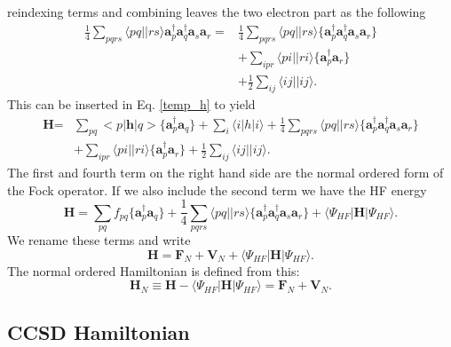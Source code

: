 \documentclass[a4paper,norsk,11pt,twoside]{report}
\begin{document}
reindexing terms and combining leaves the two electron part as the
following
\begin{align}
\frac{1}{4} \sum_{pqrs} \langle pq||rs \rangle \textbf{a}^{\dag}_p \textbf{a}^{\dag}_q \textbf{a}_s \textbf{a}_r = & \frac{1}{4}
\sum_{pqrs} \langle pq||rs \rangle \{\textbf{a}^{\dag}_p \textbf{a}^{\dag}_q \textbf{a}_s \textbf{a}_r\}
 \\ &
+ \sum_{ipr} \langle pi||ri \rangle \{\textbf{a}^{\dag}_p \textbf{a}_r \} \nonumber \\ &
+ \frac{1}{2} \sum_{ij} \langle ij||ij \rangle . \nonumber
\end{align}
This can be inserted in Eq. \eqref{temp_h} to yield
\begin{align}
\textbf{H} = & \sum_{pq} <p|\textbf{h}|q> 
\{\textbf{a}^{\dag}_p \textbf{a}_q \}
+ \sum_i \langle i|h|i \rangle
 + \frac{1}{4}
\sum_{pqrs} \langle pq||rs \rangle \{\textbf{a}^{\dag}_p \textbf{a}^{\dag}_q \textbf{a}_s \textbf{a}_r\}
 \\ &
+ \sum_{ipr} \langle pi||ri \rangle \{\textbf{a}^{\dag}_p \textbf{a}_r \}
+ \frac{1}{2} \sum_{ij} \langle ij||ij \rangle . \nonumber
\end{align}
The first and fourth term on the right hand side are the normal ordered form of the Fock operator. If we also include the second term we have the HF energy
\begin{equation}
\textbf{H} = \sum_{pq} f_{pq} 
\{\textbf{a}^{\dag}_p \textbf{a}_q \}
 + \frac{1}{4}
\sum_{pqrs} \langle pq||rs \rangle \{\textbf{a}^{\dag}_p \textbf{a}^{\dag}_q \textbf{a}_s \textbf{a}_r\}
+ \langle \Psi_{HF} | \textbf{H} |\Psi_{HF} \rangle .
\end{equation}
We rename these terms and write
\begin{equation}
\textbf{H} = \textbf{F}_N + \textbf{V}_N + \langle \Psi_{HF} | \textbf{H} |\Psi_{HF} \rangle .
\end{equation}
The normal ordered Hamiltonian is defined from this:
\begin{equation}
\textbf{H}_N \equiv 
\textbf{H} - \langle \Psi_{HF} | \textbf{H} |\Psi_{HF} \rangle = 
\textbf{F}_N + \textbf{V}_N . \label{normal_order_hamiltonian}
\end{equation}

\subsection{CCSD Hamiltonian}
\end{document}
